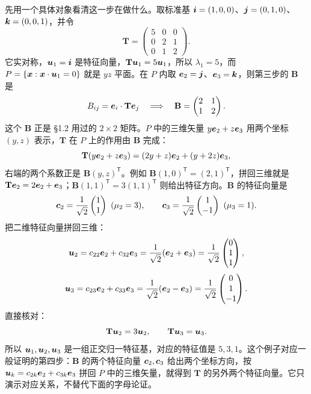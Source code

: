 \documentclass[11pt]{ctexart}
\newcommand{\ten}[1]{\mathbf{#1}}
\newcommand{\step}[1]{\par\needspace{5\baselineskip}\smallskip\noindent{\color{violetdeep}\bfseries #1}\hspace{0.35em}}
\begin{document}
\step{第四步：在平面内用 $2\times2$ 引理。}
先用一个具体对象看清这一步在做什么。取标准基 $\boldsymbol{i}=(1,0,0)$、$\boldsymbol{j}=(0,1,0)$、$\boldsymbol{k}=(0,0,1)$，并令
\[
\ten T=\begin{pmatrix}5&0&0\\0&2&1\\0&1&2\end{pmatrix}.
\]
它实对称，$\boldsymbol{u}_1=\boldsymbol{i}$ 是特征向量，$\ten T\vect u_1=5\vect u_1$，所以 $\lambda_1=5$，而 $P=\{\boldsymbol{x}:\boldsymbol{x}\cdot\boldsymbol{u}_1=0\}$ 就是 $yz$ 平面。在 $P$ 内取 $\boldsymbol{e}_2=\boldsymbol{j}$、$\boldsymbol{e}_3=\boldsymbol{k}$，则第三步的 $\ten B$ 是
\[
B_{ij}=\vect e_i\cdot\ten T\vect e_j
\quad\Longrightarrow\quad
\ten B=\begin{pmatrix}2&1\\1&2\end{pmatrix}.
\]
这个 $\ten B$ 正是 \S1.2 用过的 $2\times2$ 矩阵。$P$ 中的三维矢量 $y\boldsymbol{e}_2+z\boldsymbol{e}_3$ 用两个坐标 $(y,z)$ 表示，$\ten T$ 在 $P$ 上的作用由 $\ten B$ 完成：
\[
\ten T(y\vect e_2+z\vect e_3)
=(2y+z)\vect e_2+(y+2z)\vect e_3,
\]
右端的两个系数正是 $\ten B(y,z)^{\mathsf T}$。例如 $\ten B(1,0)^{\mathsf T}=(2,1)^{\mathsf T}$，拼回三维就是 $\ten T\vect e_2=2\vect e_2+\vect e_3$；$\ten B(1,1)^{\mathsf T}=3(1,1)^{\mathsf T}$ 则给出特征方向。$\ten B$ 的特征向量是
\[
\vect c_2=\frac{1}{\sqrt2}\begin{pmatrix}1\\1\end{pmatrix}\ (\mu_2=3),
\qquad
\vect c_3=\frac{1}{\sqrt2}\begin{pmatrix}1\\-1\end{pmatrix}\ (\mu_3=1).
\]
把二维特征向量拼回三维：
\[
\boldsymbol{u}_2=c_{22}\boldsymbol{e}_2+c_{32}\boldsymbol{e}_3
=\frac{1}{\sqrt2}(\boldsymbol{e}_2+\boldsymbol{e}_3)
=\frac{1}{\sqrt2}\begin{pmatrix}0\\1\\1\end{pmatrix},
\]
\[
\boldsymbol{u}_3=c_{23}\boldsymbol{e}_2+c_{33}\boldsymbol{e}_3
=\frac{1}{\sqrt2}(\boldsymbol{e}_2-\boldsymbol{e}_3)
=\frac{1}{\sqrt2}\begin{pmatrix}0\\1\\-1\end{pmatrix}.
\]
直接核对：
\[
\ten T\vect u_2=3\vect u_2,\qquad
\ten T\vect u_3=\vect u_3 .
\]
所以 $\boldsymbol{u}_1,\boldsymbol{u}_2,\boldsymbol{u}_3$ 是一组正交归一特征基，对应的特征值是 $5,3,1$。这个例子对应一般证明的第四步：$\ten B$ 的两个特征向量 $\boldsymbol{c}_2,\boldsymbol{c}_3$ 给出两个坐标方向，按 $\boldsymbol{u}_k=c_{2k}\boldsymbol{e}_2+c_{3k}\boldsymbol{e}_3$ 拼回 $P$ 中的三维矢量，就得到 $\ten T$ 的另外两个特征向量。它只演示对应关系，不替代下面的字母论证。
\end{document}

